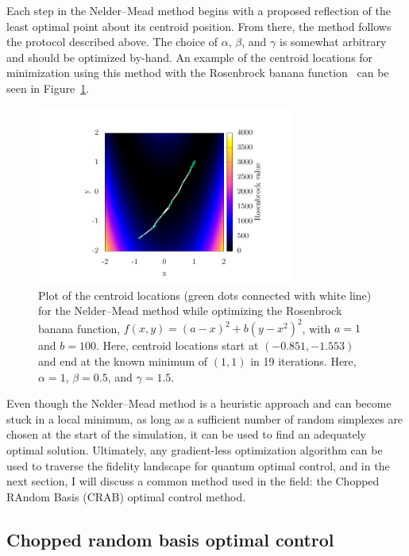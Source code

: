 Each step in the Nelder--Mead method begins with a proposed reflection of the least optimal point about its centroid position.
From there, the method follows the protocol described above.
The choice of $\alpha$, $\beta$, and $\gamma$ is somewhat arbitrary and should be optimized by-hand.
An example of the centroid locations for minimization using this method with the Rosenbrock banana function~\cite{pohlheim2007} can be seen in Figure~\ref{fig:minimize_NM}.

\begin{figure}
\center \includegraphics[width=0.75\textwidth]{data/1d/NM/NM.pdf}
\caption{Plot of the centroid locations (green dots connected with white line) for the Nelder--Mead method while optimizing the Rosenbrock banana function, $f(x,y)=(a-x)^2+b(y-x^2)^2$, with $a=1$ and $b=100$.
Here, centroid locations start at $(-0.851,-1.553)$ and end at the known minimum of $(1,1)$ in 19 iterations.
Here, $\alpha = 1$, $\beta = 0.5$, and $\gamma = 1.5$.}
\label{fig:minimize_NM}
\end{figure}

Even though the Nelder--Mead method is a heuristic approach and can become stuck in a local minimum, as long as a sufficient number of random simplexes are chosen at the start of the simulation, it can be used to find an adequately optimal solution.
Ultimately, any gradient-less optimization algorithm can be used to traverse the fidelity landscape for quantum optimal control, and in the next section, I will discuss a common method used in the field: the Chopped RAndom Basis (CRAB) optimal control method.

\subsection{Chopped random basis optimal control}
\label{sec:CRAB}

